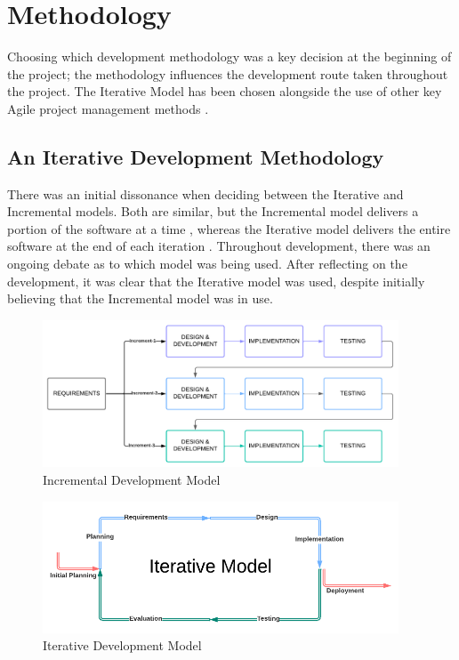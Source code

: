 \chapter{Methodology}
\label{chap:methodology}

Choosing which development methodology was a key decision at the beginning of the project; the methodology influences the development route taken throughout the project. The Iterative Model has been chosen alongside the use of other key Agile project management methods .

\section{An Iterative Development Methodology}
\label{methodology:chosen}

There was an initial dissonance when deciding between the Iterative and Incremental models. Both are similar, but the Incremental model delivers a portion of the software at a time , whereas the Iterative model delivers the entire software at the end of each iteration . Throughout development, there was an ongoing debate as to which model was being used. After reflecting on the development, it was clear that the Iterative model was used, despite initially believing that the Incremental model was in use. 

\begin{figure}
    \centering
    \includegraphics[width=400px]{figures/incremental-model.pdf}
    \caption{Incremental Development Model}
    \label{fig:incremental}
\end{figure}

\begin{figure}
    \centering
    \includegraphics[width=400px]{figures/iterative-model.pdf}
    \caption{Iterative Development Model}
    \label{fig:iterative}
\end{figure}

